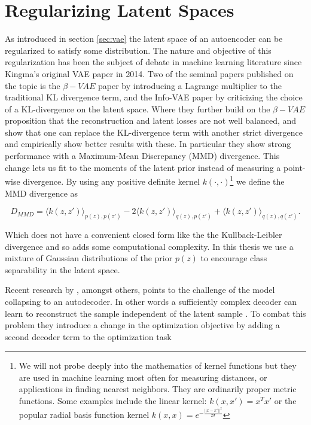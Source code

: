 \section{Regularizing Latent Spaces}\label{sec:latent}

As introduced in section \ref{sec:vae} the latent space of an autoencoder can be regularized to satisfy some distribution. The nature and objective of this regularization has been the subject of debate in machine learning literature since Kingma's original VAE paper in 2014. Two of the seminal papers published on the topic is the $\beta-VAE$ paper by \citet{Higgins2017} introducing a Lagrange multiplier to the traditional KL divergence term, and the Info-VAE paper by \citet{Zhao} criticizing the choice of a KL-divergence on the latent space. Where they further build on the $\beta-VAE$ proposition that the reconstruction and latent losses are not well balanced, and show that one can replace the KL-divergence term with another strict divergence and empirically show better results with these. In particular they show strong performance with a Maximum-Mean Discrepancy (MMD) divergence. This change lets us fit to the moments of the latent prior instead of measuring a point-wise divergence. By using any positive definite kernel $k(\cdot, \cdot)$\footnote{We will not probe deeply into the mathematics of kernel functions but they are used in machine learning most often for measuring distances, or applications in finding nearest neighbors. They are ordinarily proper metric functions. Some examples include the linear kernel: $k(x, x') = x^Tx'$ or the popular radial basis function kernel $k(x, x)=e^{-\frac{||x - x'||^2}{2\sigma}}$}  we define the MMD divergence as  

\begin{equation}\label{eq:mmd}
D_{MMD} = \langle k(z, z')\rangle_{p(z), p(z')} - 2 \langle k(z, z')\rangle_{q(z), p(z')} + \langle k(z, z')\rangle_{q(z), q(z')}.
\end{equation}

\noindent Which does not have a convenient closed form like the the Kullback-Leibler divergence and so adds some computational complexity. In this thesis we use a mixture of Gaussian distributions of the prior $p(z)$ to encourage class separability in the latent space.

Recent research by \citet{Seybold2019}, amongst others, points to the challenge of the model collapsing to an autodecoder. In other words a sufficiently complex decoder can learn to reconstruct the sample independent of the latent sample \cite{Seybold2019}. To combat this problem they introduce a change in the optimization objective by adding a second decoder term to the optimization task

